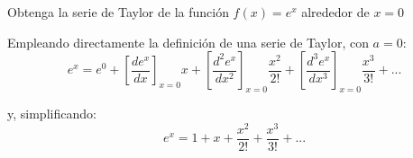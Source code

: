 \begin{ex}
    Obtenga la serie de Taylor de la función \(f(x) = e^x\) alrededor de \(x = 0\)
    \begin{solution}

        Empleando directamente la definición de una serie de Taylor, con \(a = 0\):
        \[
            e^x = e^0 + \left[\frac{de^x}{dx}\right]_{x = 0} x + \left[\frac{d^2e^x}{dx^2}\right]_{x = 0} \frac{x^2}{2!} + \left[\frac{d^3e^x}{dx^3}\right]_{x = 0} \frac{x^3}{3!} + ...
        \]

        \noindent y, simplificando:
        \[
            \boxed{e^x = 1 + x + \frac{x^2}{2!} + \frac{x^3}{3!} + ...}
        \]

    \end{solution}
\end{ex}


